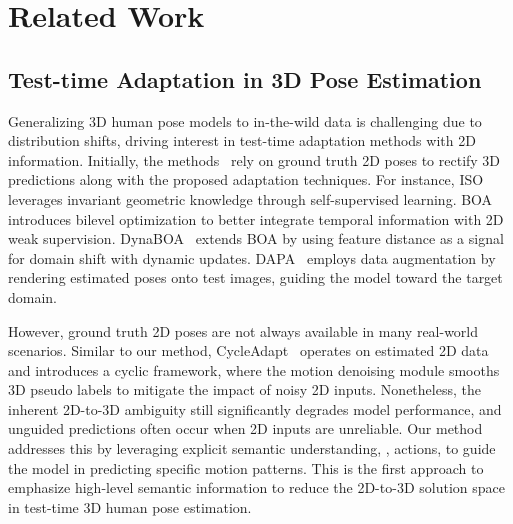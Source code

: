 \section{Related Work}
\label{sec:relatedwork}

\subsection{Test-time Adaptation in 3D Pose Estimation}
Generalizing 3D human pose models to in-the-wild data is challenging due to distribution shifts, driving interest in test-time adaptation methods with 2D information. Initially, the methods~\cite{iso,boa,dynaboa,DAPA} rely on ground truth 2D poses to rectify 3D predictions along with the proposed adaptation techniques. For instance, ISO~\cite{iso} leverages invariant geometric knowledge through self-supervised learning. BOA~\cite{boa} introduces bilevel optimization to better integrate temporal information with 2D weak supervision. DynaBOA~\cite{dynaboa} extends BOA by using feature distance as a signal for domain shift with dynamic updates. DAPA~\cite{DAPA} employs data augmentation by rendering estimated poses onto test images, guiding the model toward the target domain. 

However, ground truth 2D poses are not always available in many real-world scenarios. 
Similar to our method,
CycleAdapt~\cite{cycleadapt} operates on estimated 2D data and introduces a cyclic framework, where the motion denoising module smooths 3D pseudo labels to mitigate the impact of noisy 2D inputs.
Nonetheless, the inherent 2D-to-3D ambiguity still significantly degrades model performance, and unguided predictions often occur when 2D inputs are unreliable.
Our method addresses this by leveraging explicit semantic understanding, \ie, actions, to guide the model in predicting specific motion patterns.
This is the first approach to emphasize high-level semantic information to reduce the 2D-to-3D solution space in test-time 3D human pose estimation.



